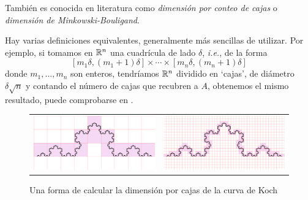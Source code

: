 También es conocida en literatura como \textit{dimensión por conteo de cajas} o \textit{dimensión de Minkowski-Bouligand}.

Hay varias definiciones equivalentes, generalmente más sencillas de utilizar. Por ejemplo, si tomamos en $\mathbb{R}^n$ una cuadrícula de lado $\delta$, \textit{i.e.}, de la forma
$$
[m_1 \delta, (m_1+1)\delta]\times\cdots\times[m_n \delta, (m_n+1)\delta]
$$
donde $m_1,\dots,m_n$ son enteros, tendríamos $\mathbb{R}^n$ dividido en `cajas', de diámetro $\delta\sqrt{n}$ y contando el número de cajas que recubren a $A$, obtenemos el mismo resultado, puede comprobarse en \cite[sección 3.1]{alma991007022459704990}.


\begin{figure}[ht]
\begin{tabular}{cc}
\includegraphics[scale=0.17]{./img/cajas-grandes.png} &   \includegraphics[scale=0.17]{./img/cajas-peques.png} \\
\end{tabular}
\caption{Una forma de calcular la dimensión por cajas de la curva de Koch}
\label{fig:dim-cajas}
\end{figure}

